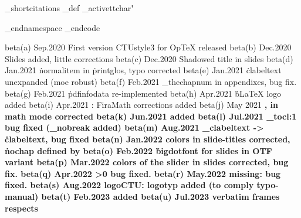 \_shortcitations
\_def
\_activettchar"

\_endnamespace %
\_endcode


beta(a) Sep.2020  First version CTUstyle3 for OpTeX released
beta(b) Dec.2020  Slides added, little corrections
beta(c) Dec.2020  Shadowed title in slides
beta(d) Jan.2021  \.normalitem in \.printglos, typo corrected
beta(e) Jan.2021  \.clabeltext unexpanded (moe robust)
beta(f) Feb.2021  \_thechapnum in appendixes, bug fix.
beta(g) Feb.2021  \.pdfinfodata re-implemented
beta(h) Apr.2021  \.bLaTeX logo added
beta(i) Apr.2021  \slides: FiraMath corrections added
beta(j) May 2021  \bf, \bi in math mode corrected
beta(k) Jun.2021  \oddchapters added
beta(l) Jul.2021  \_tocl:1 bug fixed (\_nobreak added)
beta(m) Aug.2021  \_clabeltext -> \.clabeltext, bug fixed
beta(n) Jan.2022  colors in slide-titles corrected, \.nochap defined by \eoldef
beta(o) Feb.2022  \.bigdotfont for slides in OTF variant
beta(p) Mar.2022  colors of the slider in slides corrected, bug fix.
beta(q) Apr.2022  \ttline>0 bug fixed.
beta(r) May.2022  \shiftoffset missing: bug fixed.
beta(s) Aug.2022  logoCTU: logotyp added (to comply typo-manual)
beta(t) Feb.2023  \fnumbering added
beta(u) Jul.2023  verbatim frames respects \leftskip
